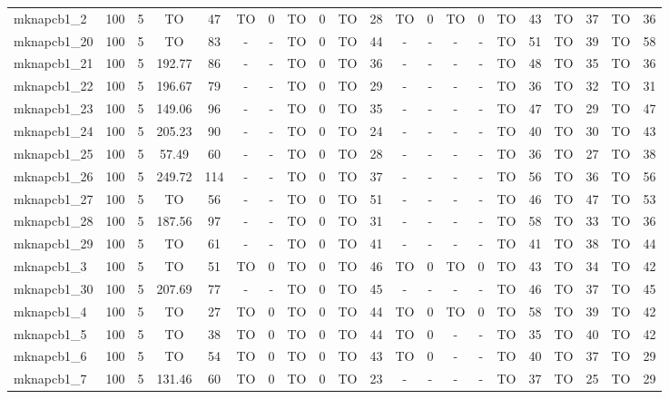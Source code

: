 \begin{sidewaystable}[!ht]
{\begin{tabular}{lcccccccccccccccccccc}
mknapcb1\_2 & 100 & 5 & TO & 47 & TO & 0 & TO & 0 & TO & 28 & TO & 0 & TO & 0 & TO & 43 & TO & 37 & TO & 36 \\
mknapcb1\_20 & 100 & 5 & TO & 83 &  - &  - & TO & 0 & TO & 44 &  - &  - &  - &  - & TO & 51 & TO & 39 & TO & 58 \\
mknapcb1\_21 & 100 & 5 & 192.77 & 86 &  - &  - & TO & 0 & TO & 36 &  - &  - &  - &  - & TO & 48 & TO & 35 & TO & 36 \\
mknapcb1\_22 & 100 & 5 & 196.67 & 79 &  - &  - & TO & 0 & TO & 29 &  - &  - &  - &  - & TO & 36 & TO & 32 & TO & 31 \\
mknapcb1\_23 & 100 & 5 & 149.06 & 96 &  - &  - & TO & 0 & TO & 35 &  - &  - &  - &  - & TO & 47 & TO & 29 & TO & 47 \\
mknapcb1\_24 & 100 & 5 & 205.23 & 90 &  - &  - & TO & 0 & TO & 24 &  - &  - &  - &  - & TO & 40 & TO & 30 & TO & 43 \\
mknapcb1\_25 & 100 & 5 & 57.49 & 60 &  - &  - & TO & 0 & TO & 28 &  - &  - &  - &  - & TO & 36 & TO & 27 & TO & 38 \\
mknapcb1\_26 & 100 & 5 & 249.72 & 114 &  - &  - & TO & 0 & TO & 37 &  - &  - &  - &  - & TO & 56 & TO & 36 & TO & 56 \\
mknapcb1\_27 & 100 & 5 & TO & 56 &  - &  - & TO & 0 & TO & 51 &  - &  - &  - &  - & TO & 46 & TO & 47 & TO & 53 \\
mknapcb1\_28 & 100 & 5 & 187.56 & 97 &  - &  - & TO & 0 & TO & 31 &  - &  - &  - &  - & TO & 58 & TO & 33 & TO & 36 \\
mknapcb1\_29 & 100 & 5 & TO & 61 &  - &  - & TO & 0 & TO & 41 &  - &  - &  - &  - & TO & 41 & TO & 38 & TO & 44 \\
mknapcb1\_3 & 100 & 5 & TO & 51 & TO & 0 & TO & 0 & TO & 46 & TO & 0 & TO & 0 & TO & 43 & TO & 34 & TO & 42 \\
mknapcb1\_30 & 100 & 5 & 207.69 & 77 &  - &  - & TO & 0 & TO & 45 &  - &  - &  - &  - & TO & 46 & TO & 37 & TO & 45 \\
mknapcb1\_4 & 100 & 5 & TO & 27 & TO & 0 & TO & 0 & TO & 44 & TO & 0 & TO & 0 & TO & 58 & TO & 39 & TO & 42 \\
mknapcb1\_5 & 100 & 5 & TO & 38 & TO & 0 & TO & 0 & TO & 44 & TO & 0 &  - &  - & TO & 35 & TO & 40 & TO & 42 \\
mknapcb1\_6 & 100 & 5 & TO & 54 & TO & 0 & TO & 0 & TO & 43 & TO & 0 &  - &  - & TO & 40 & TO & 37 & TO & 29 \\
mknapcb1\_7 & 100 & 5 & 131.46 & 60 & TO & 0 & TO & 0 & TO & 23 &  - &  - &  - &  - & TO & 37 & TO & 25 & TO & 29 \\

\end{tabular}}
\end{sidewaystable}
